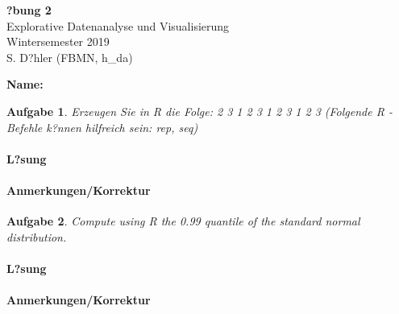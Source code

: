 \documentclass[]{article}
\title{}
\author{}
\date{}
\let\oldparagraph\paragraph
\renewcommand{\paragraph}[1]{\oldparagraph{#1}\mbox{}}
\begin{document}
\theoremstyle{break}
\newtheorem{auf}{Aufgabe}

\newcommand{\R}{{\sffamily R} }

\begin{centering}
\Huge
{\bf ?bung 2}\\
\Large
Explorative Datenanalyse und Visualisierung\\
\normalsize
Wintersemester 2019\\
S. D?hler (FBMN, h\_da)\\
\end{centering}

\hrulefill

\textbf{Name: }

\hrulefill

\setcounter{auf}{2}
\begin{auf}

Erzeugen Sie in {\sffamily R} die Folge:
{ 2 3 1 2 3 1 2 3 1 2 3}
\newline
\newline
(Folgende {\sffamily R} -Befehle k?nnen hilfreich sein: {\ttfamily rep, seq})

\end{auf}

\paragraph{L?sung}

\paragraph{Anmerkungen/Korrektur}

\textcolor{gray}{\hrulefill}

\begin{auf}
Compute using {\sffamily R} the 0.99 quantile of the standard normal distribution.
\end{auf}

\paragraph{L?sung}

\paragraph{Anmerkungen/Korrektur}

\textcolor{gray}{\hrulefill}
\end{document}

